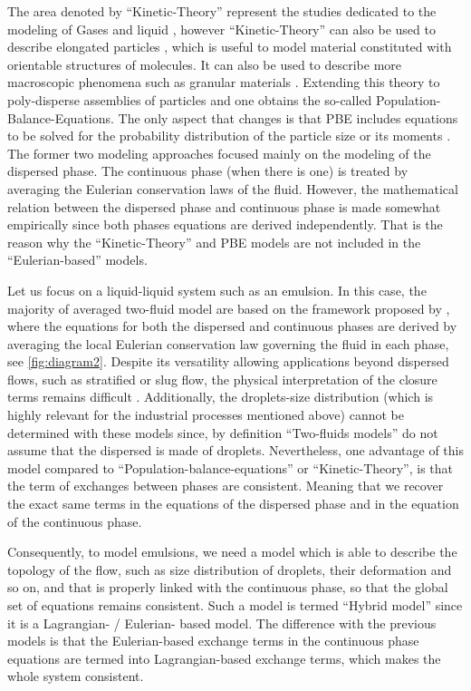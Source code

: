 The area denoted by ``Kinetic-Theory'' represent the studies dedicated to the modeling of Gases and liquid \citep{hansen2013theory,kardar2007statistical}, however  
``Kinetic-Theory'' can also be used to describe elongated particles \citet{curtiss1956kinetic}, which is useful to model material constituted with orientable structures of molecules.
It can also be used to describe more macroscopic phenomena such as granular materials \citet{rao2008introduction}.  
Extending this theory to poly-disperse assemblies of particles and one obtains the so-called Population-Balance-Equations. 
The only aspect that changes is that PBE includes equations to be solved for the probability distribution of the particle size or its moments \citep{fox2023generalized,randolph2012theory}. 
The former two modeling approaches focused mainly on the modeling of the dispersed phase.
The continuous phase (when there is one) is treated by averaging the Eulerian conservation laws of the fluid. 
However, the mathematical relation between the dispersed phase and continuous phase is made somewhat empirically since both phases equations are derived independently. 
That is the reason why the ``Kinetic-Theory'' and PBE models are not included in the ``Eulerian-based'' models. 

Let us focus on a liquid-liquid system such as an emulsion. 
In this case, the majority of averaged two-fluid model are based on the framework proposed by \citet{drew1983mathematical}, where the equations for both the dispersed and continuous phases are derived by averaging the local Eulerian conservation law governing the fluid in each phase, see \ref{fig:diagram2}.
Despite its versatility allowing applications beyond dispersed flows, such as stratified or slug flow, the physical interpretation of the closure terms remains difficult \citep{drew1983mathematical}.
Additionally, the droplets-size distribution (which is highly relevant for the industrial processes mentioned above) cannot be determined with these models since, by definition ``Two-fluids models'' do not assume that the dispersed is made of droplets.
Nevertheless, one advantage of this model compared to ``Population-balance-equations'' or ``Kinetic-Theory'', is that the term of exchanges between phases are consistent. 
Meaning that we recover the exact same terms in the equations of the dispersed phase and in the equation of the continuous phase. 

Consequently, to model emulsions, we need a model  which is able to describe the topology of the flow, such as size distribution of droplets, their deformation and so on, and that is properly linked with the continuous phase, so that the global set of equations remains consistent. 
Such a model is termed ``Hybrid model'' since it is a Lagrangian- / Eulerian- based model.
The difference with the previous models is that the Eulerian-based exchange terms in the continuous phase equations are termed into Lagrangian-based exchange terms, which makes the whole system consistent. 

